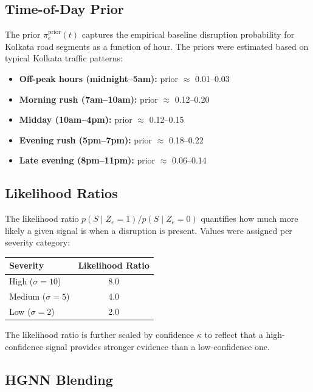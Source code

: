 \documentclass[12pt, a4paper]{report}
\begin{document}
\subsection{Time-of-Day Prior}

The prior $\pi_e^{\text{prior}}(t)$ captures the empirical baseline disruption probability for Kolkata road segments as a function of hour. The priors were estimated based on typical Kolkata traffic patterns:

\begin{itemize}
    \item \textbf{Off-peak hours (midnight--5am):} prior $\approx$ 0.01--0.03
    \item \textbf{Morning rush (7am--10am):} prior $\approx$ 0.12--0.20
    \item \textbf{Midday (10am--4pm):} prior $\approx$ 0.12--0.15
    \item \textbf{Evening rush (5pm--7pm):} prior $\approx$ 0.18--0.22
    \item \textbf{Late evening (8pm--11pm):} prior $\approx$ 0.06--0.14
\end{itemize}

\subsection{Likelihood Ratios}

The likelihood ratio $p(S \mid Z_e=1) / p(S \mid Z_e=0)$ quantifies how much more likely a given signal is when a disruption is present. Values were assigned per severity category:

\begin{center}
\begin{tabular}{|l|c|}
\hline
\textbf{Severity} & \textbf{Likelihood Ratio} \\
\hline
High ($\sigma = 10$)   & 8.0 \\
Medium ($\sigma = 5$)  & 4.0 \\
Low ($\sigma = 2$)     & 2.0 \\
\hline
\end{tabular}
\end{center}

The likelihood ratio is further scaled by confidence $\kappa$ to reflect that a high-confidence signal provides stronger evidence than a low-confidence one.

\subsection{HGNN Blending}
\end{document}

